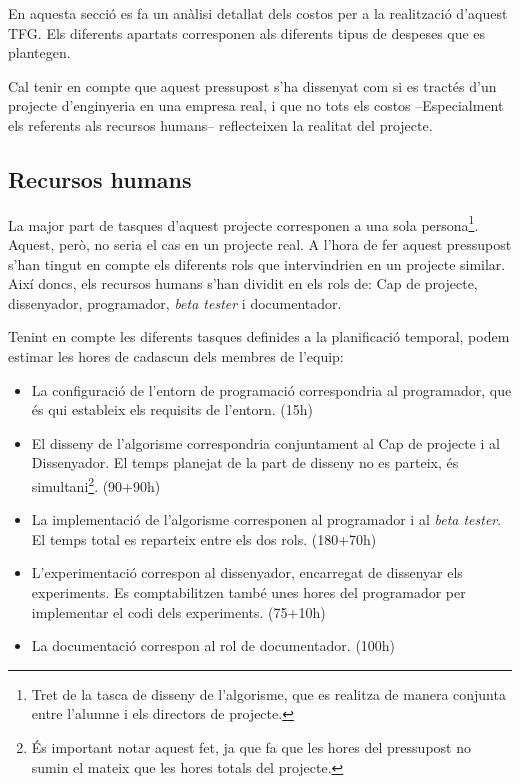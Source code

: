 En aquesta secció es fa un anàlisi detallat dels costos per a la realització d'aquest TFG. Els diferents apartats corresponen als diferents tipus de despeses que es plantegen. 

Cal tenir en compte que aquest pressupost s'ha dissenyat com si es tractés d'un projecte d'enginyeria en una empresa real, i que no tots els costos --Especialment els referents als recursos humans-- reflecteixen la realitat del projecte.

\subsection{Recursos humans}

La major part de tasques d'aquest projecte corresponen a una sola persona\footnote{Tret de la tasca de disseny de l'algorisme, que es realitza de manera conjunta entre l'alumne i els directors de projecte.}. Aquest, però, no seria el cas en un projecte real. A l'hora de fer aquest pressupost s'han tingut en compte els diferents rols que intervindrien en un projecte similar. Així doncs, els recursos humans s'han dividit en els rols de: Cap de projecte, dissenyador, programador, \emph{beta tester} i documentador.

Tenint en compte les diferents tasques definides a la planificació temporal, podem estimar les hores de cadascun dels membres de l'equip:

\begin{itemize}
    \item La configuració de l'entorn de programació correspondria al programador, que és qui estableix els requisits de l'entorn. (15h)
    \item El disseny de l'algorisme correspondria conjuntament al Cap de projecte i al Dissenyador. El temps planejat de la part de disseny no es parteix, és simultani\footnote{És important notar aquest fet, ja que fa que les hores del pressupost no sumin el mateix que les hores totals del projecte.}. (90+90h)
    \item La implementació de l'algorisme corresponen al programador i al \emph{beta tester}. El temps total es reparteix entre els dos rols. (180+70h)
    \item L'experimentació correspon al dissenyador, encarregat de dissenyar els experiments. Es comptabilitzen també unes hores del programador per implementar el codi dels experiments. (75+10h)
    \item La documentació correspon al rol de documentador. (100h)
\end{itemize}

